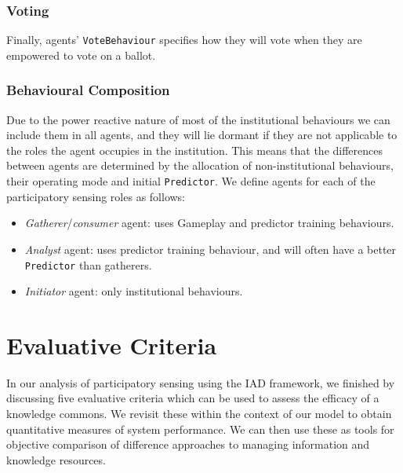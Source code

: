\subsubsection*{Voting}

Finally, agents' \texttt{VoteBehaviour} specifies how they will vote when they are empowered to vote on a ballot. 

\subsubsection*{Behavioural Composition}

Due to the power reactive nature of most of the institutional behaviours we can include them in all agents, and they will lie dormant if they are not applicable to the roles the agent occupies in the institution. This means that the differences between agents are determined by the allocation of non-institutional behaviours, their operating mode and initial \texttt{Predictor}. We define agents for each of the participatory sensing roles as follows:

\begin{itemize}
\item \emph{Gatherer}/\emph{consumer} agent: uses Gameplay and predictor training behaviours.
\item \emph{Analyst} agent: uses predictor training behaviour, and will often have a better \texttt{Predictor} than gatherers.
\item \emph{Initiator} agent: only institutional behaviours.
\end{itemize}

\section{Evaluative Criteria}

In our analysis of participatory sensing using the \ac{IAD} framework, we finished by
discussing five evaluative criteria which can be used to assess the efficacy
of a knowledge commons. We revisit these within the context of our model to
obtain quantitative measures of system performance. We can then use these as
tools for objective comparison of difference approaches to managing
information and knowledge resources.

